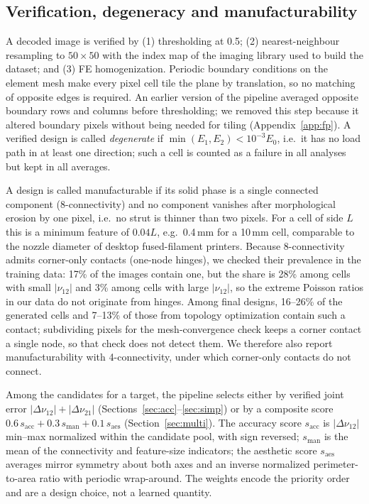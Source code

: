 \documentclass[a4paper,11pt]{article}
\newcommand{\nuot}{\nu_{12}}
\newcommand{\nuto}{\nu_{21}}
\begin{document}
\subsection{Verification, degeneracy and manufacturability}
\label{sec:verify}
A decoded image is verified by (1) thresholding at 0.5; (2)
nearest-neighbour resampling to $50\times50$ with the index map of the
imaging library used to build the dataset; and (3) FE homogenization. Periodic
boundary conditions on the element mesh make every pixel cell tile the plane
by translation, so no matching of opposite edges is required. An earlier
version of the pipeline averaged opposite boundary rows and columns before
thresholding; we removed this step because it altered boundary pixels
without being needed for tiling (Appendix~\ref{app:fp}). A verified design
is called \emph{degenerate} if $\min(E_1,E_2)<10^{-3}E_0$, i.e.\ it has no
load path in at least one direction; such a cell is counted as a failure in
all analyses but kept in all averages.

A design is called manufacturable if its solid phase is a single connected
component (8-connectivity) and no component vanishes after morphological
erosion by one pixel, i.e.\ no strut is thinner than two pixels. For a cell
of side $L$ this is a minimum feature of $0.04L$, e.g.\ 0.4\,mm for a 10\,mm
cell, comparable to the nozzle diameter of desktop fused-filament printers.
Because 8-connectivity admits corner-only contacts (one-node hinges), we
checked their prevalence in the training data: 17\% of the images contain one,
but the share is 28\% among cells with small $|\nuot|$ and 3\% among
cells with large $|\nuot|$, so the extreme Poisson ratios in our data do not originate from
hinges. Among final designs, 16--26\% of the generated cells and 7--13\% of
those from topology optimization contain such a contact; subdividing pixels
for the mesh-convergence check keeps a corner contact a single node, so that
check does not detect them. We therefore also report manufacturability with
4-connectivity, under which corner-only contacts do not connect.

Among the candidates for a target, the pipeline selects either by verified
joint error $|\Delta\nuot|+|\Delta\nuto|$ (Sections~\ref{sec:acc}--\ref{sec:simp})
or by a composite score
$0.6\,s_{\mathrm{acc}}+0.3\,s_{\mathrm{man}}+0.1\,s_{\mathrm{aes}}$
(Section~\ref{sec:multi}). The accuracy score $s_{\mathrm{acc}}$ is
$|\Delta\nuot|$ min--max normalized within the candidate pool, with sign
reversed; $s_{\mathrm{man}}$ is the mean of the connectivity and
feature-size indicators; the aesthetic score $s_{\mathrm{aes}}$ averages
mirror symmetry about both axes and an inverse normalized perimeter-to-area
ratio with periodic wrap-around. The weights encode the priority order and
are a design choice, not a learned quantity.
\end{document}
